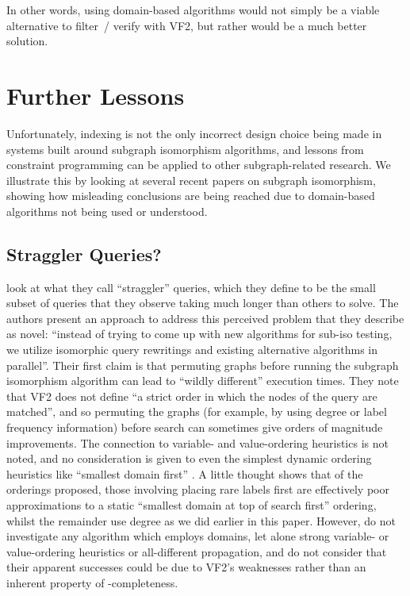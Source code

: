 \documentclass[twoside,11pt]{article}
\newcommand{\citet}[1]{\citeA{#1}}
\newcommand{\citep}[1]{\cite{#1}}
\begin{document}
In other words, using domain-based algorithms would not simply be a viable alternative to filter~/
verify with VF2, but rather would be a much better solution.

\section{Further Lessons}\label{section:angryranting}

Unfortunately, indexing is not the only incorrect design choice being made in systems built around
subgraph isomorphism algorithms, and lessons from constraint programming can be applied to other
subgraph-related research. We illustrate this by looking at several recent papers on subgraph
isomorphism, showing how misleading conclusions are being reached due to domain-based algorithms not
being used or understood.

\subsection{Straggler Queries?}

\citet{DBLP:conf/edbt/KatsarouNT17} look at what they call ``straggler'' queries, which they define
to be the small subset of queries that they observe taking much longer than others to solve. The
authors present an approach to address this perceived problem that they describe as novel: ``instead
of trying to come up with new algorithms for sub-iso testing, we utilize isomorphic query rewritings
and existing alternative algorithms in parallel''. Their first claim is that permuting graphs before
running the subgraph isomorphism algorithm can lead to ``wildly different'' execution times. They
note that VF2 does not define ``a strict order in which the nodes of the query are matched'', and so
permuting the graphs (for example, by using degree or label frequency information) before search can
sometimes give orders of magnitude improvements. The connection to variable- and value-ordering
heuristics is not noted, and no consideration is given to even the simplest dynamic ordering
heuristics like ``smallest domain first'' \citep{DBLP:journals/ai/HaralickE80}. A little thought
shows that of the orderings proposed, those involving placing rare labels first are effectively poor
approximations to a static ``smallest domain at top of search first'' ordering, whilst the remainder
use degree as we did earlier in this paper. However, \citeauthor{DBLP:conf/edbt/KatsarouNT17} do not
investigate any algorithm which employs domains, let alone strong variable- or value-ordering
heuristics or all-different propagation, and do not consider that their apparent successes could be
due to VF2's weaknesses rather than an inherent property of \NP-completeness.
\end{document}

